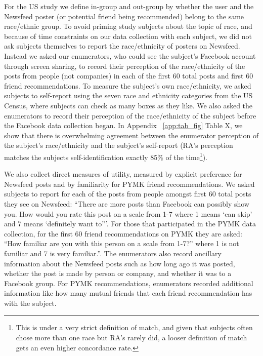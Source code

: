 \documentclass[12pt,letterpaper]{article}
\begin{document}
For the US study we define in-group and out-group by whether the user and the Newsfeed poster (or potential friend being recommended) belong to the same race/ethnic group. To avoid priming study subjects about the topic of race, and because of time constraints on our data collection with each subject, we did not ask subjects themselves to report the race/ethnicity of posters on Newsfeed. Instead we asked our enumerators, who could see the subject's Facebook account through screen sharing, to record their perception of the  race/ethnicity of the posts from people (not companies) in each of the first 60 total posts and first 60 friend recommendations. To measure the subject's own race/ethnicity, we asked subjects to self-report using the seven race and ethnicity categories from the US Census, where subjects can check as many boxes as they like. We also asked the enumerators to record their perception of the race/ethnicity of the subject before the Facebook data collection began. In Appendix ~\ref{app:tab_fig} Table X, we show that there is overwhelming agreement between the enumerator perception of the subject's race/ethnicity and the subject's self-report (RA's perception matches the subjects self-identification exactly 85\% of the time\footnote{This is under a very strict definition of match, and given that subjects often chose more than one race but RA's rarely did, a looser definition of match gets an even higher concordance rate.}).


We also collect direct measures of utility, measured by explicit preference for Newsfeed posts and by familiarity for PYMK friend recommendations. We asked subjects to report for each of the posts from people amongst first 60 total posts they see on Newsfeed: “There are more posts than Facebook can possibly show you. How would you rate this post on a scale from 1-7 where 1 means ‘can skip’ and 7 means ‘definitely want to'''. For those that participated in the PYMK data collection, for the first 60 friend recommendations on PYMK they are asked: “How familiar are you with this person on a scale from 1-7?” where 1 is not familiar and 7 is very familiar.''. The enumerators also record ancillary information about the Newsfeed posts such as how long ago it was posted, whether the post is made by person or company, and whether it was to a Facebook group. For PYMK recommendations, enumerators recorded additional information like how many mutual friends that each friend recommendation has with the subject.
\end{document}
